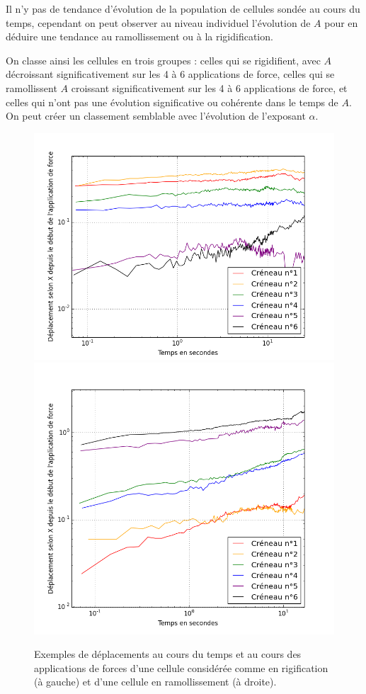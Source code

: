 Il n'y pas de tendance d'évolution de la population de cellules sondée au cours du temps, cependant on peut observer au niveau individuel l'évolution de $A$ pour en déduire une tendance au ramollissement ou à la rigidification. 

On classe ainsi les cellules en trois groupes : celles qui se rigidifient, avec $A$ décroissant significativement sur les 4 à 6 applications de force, celles qui se ramollissent $A$ croissant significativement sur les 4 à 6 applications de force, et celles qui n'ont pas une évolution significative ou cohérente dans le temps de $A$. 
On peut créer un classement semblable avec l'évolution de l'exposant $\alpha$. 
\begin{figure}
\includegraphics[scale=0.33]{Figures/Rigidification_exemple_s2c2.png} 
\includegraphics[scale=0.3]{Figures/Ramollissement_exemple_s2c19.png} 
\caption{Exemples de déplacements au cours du temps et au cours des applications de forces d'une cellule considérée comme en rigification (à gauche) et d'une cellule en ramollissement (à droite). }
\end{figure}

